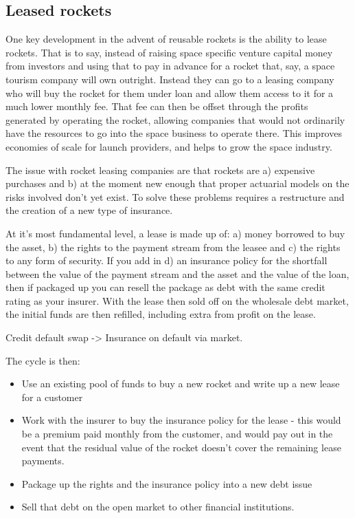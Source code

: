 \documentclass[10pt]{article}
\begin{document}
\subsection{Leased rockets}
One key development in the advent of reusable rockets is the ability to lease rockets. That is to say, instead of raising space specific venture capital money from investors and using that to pay in advance for a rocket that, say, a space tourism company will own outright. Instead they can go to a leasing company who will buy the rocket for them under loan and allow them access to it for a much lower monthly fee. That fee can then be offset through the profits generated by operating the rocket, allowing companies that would not ordinarily have the resources to go into the space business to operate there. This improves economies of scale for launch providers, and helps to grow the space industry.

The issue with rocket leasing companies are that rockets are a) expensive purchases and b) at the moment new enough that proper actuarial models on the risks involved don't yet exist. To solve these problems requires a restructure and the creation of a new type of insurance.

At it's most fundamental level, a lease is made up of: a) money borrowed to buy the asset, b) the rights to the payment stream from the leasee and c) the rights to any form of security. If you add in d) an insurance policy for the shortfall between the value of the payment stream and the asset and the value of the loan, then if packaged up you can resell the package as debt with the same credit rating as your insurer. With the lease then sold off on the wholesale debt market, the initial funds are then refilled, including extra from profit on the lease. 

Credit default swap -> Insurance on default via market.

The cycle is then:
\begin{itemize}
    \item Use an existing pool of funds to buy a new rocket and write up a new lease for a customer
    \item Work with the insurer to buy the insurance policy for the lease - this would be a premium paid monthly from the customer, and would pay out in the event that the residual value of the rocket doesn't cover the remaining lease payments.
    \item Package up the rights and the insurance policy into a new debt issue
    \item Sell that debt on the open market to other financial institutions.
\end{itemize}
\end{document}
